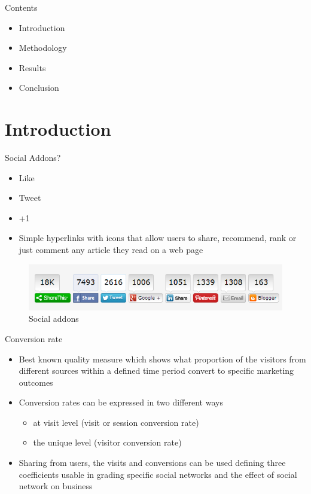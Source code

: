 
\begin{frame}{Contents}
	\begin{itemize}
	  \item Introduction
	  \item Methodology
	  \item Results
	  \item Conclusion
	\end{itemize}
\end{frame}

\section{Introduction}

\begin{frame}{Social Addons?}
	\begin{itemize}
	  \item Like
	  \item Tweet
	  \item +1
	  \item Simple hyperlinks with icons that allow users to
share, recommend, rank or just comment any article they read
on a web page
	\end{itemize}
	    \begin{figure}
    \centering
        \includegraphics[width=.8\textwidth]{images/viral/social_plugins}
        \caption{Social addons}
        \label{fig:social_plugins}
    \end{figure}
\end{frame}

\begin{frame}{Conversion rate}
    \begin{itemize}
      \item Best known quality measure which shows what proportion of the
      visitors from different sources within a defined time period convert to
      specific marketing outcomes
      \item Conversion rates can be expressed in two different ways
      \begin{itemize}
        \item at visit level (visit or session conversion rate)
        \item the unique level (visitor conversion rate)
      \end{itemize}
      \item Sharing from users, the visits and conversions can be used
defining three coefficients usable in grading specific social
networks and the effect of social network on business
    \end{itemize}

\end{frame}


